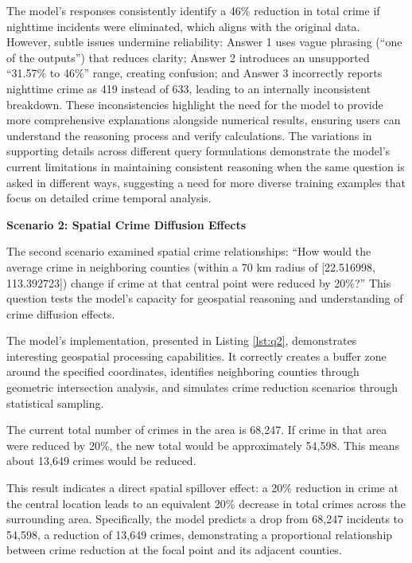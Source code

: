 The model's responses consistently identify a 46\% reduction in total crime if nighttime incidents were eliminated, which aligns with the original data. However, subtle issues undermine reliability: Answer 1 uses vague phrasing (``one of the outputs'') that reduces clarity; Answer 2 introduces an unsupported ``31.57\% to 46\%'' range, creating confusion; and Answer 3 incorrectly reports nighttime crime as 419 instead of 633, leading to an internally inconsistent breakdown. These inconsistencies highlight the need for the model to provide more comprehensive explanations alongside numerical results, ensuring users can understand the reasoning process and verify calculations. The variations in supporting details across different query formulations demonstrate the model's current limitations in maintaining consistent reasoning when the same question is asked in different ways, suggesting a need for more diverse training examples that focus on detailed crime temporal analysis.


\noindent \textbf{Scenario 2: Spatial Crime Diffusion Effects}  %

The second scenario examined spatial crime relationships: ``How would the average crime in neighboring counties (within a 70 km radius of [22.516998, 113.392723]) change if crime at that central point were reduced by 20\%?'' This question tests the model's capacity for geospatial reasoning and understanding of crime diffusion effects.

The model's implementation, presented in Listing \ref{lst:q2}, demonstrates interesting geospatial processing capabilities. It correctly creates a buffer zone around the specified coordinates, identifies neighboring counties through geometric intersection analysis, and simulates crime reduction scenarios through statistical sampling.



\begin{tcolorbox}[colback=white!95!black, colframe=black, title=Q2 Response, fontupper=\scriptsize, boxsep=2pt, left=3pt, right=3pt]
  The current total number of crimes in the area is 68,247. If crime in that area were reduced by 20\%, the new total would be approximately 54,598. This means about 13,649 crimes would be reduced.
\end{tcolorbox}

This result indicates a direct spatial spillover effect: a 20\% reduction in crime at the central location leads to an equivalent 20\% decrease in total crimes across the surrounding area. Specifically, the model predicts a drop from 68,247 incidents to 54,598, a reduction of 13,649 crimes, demonstrating a proportional relationship between crime reduction at the focal point and its adjacent counties.

